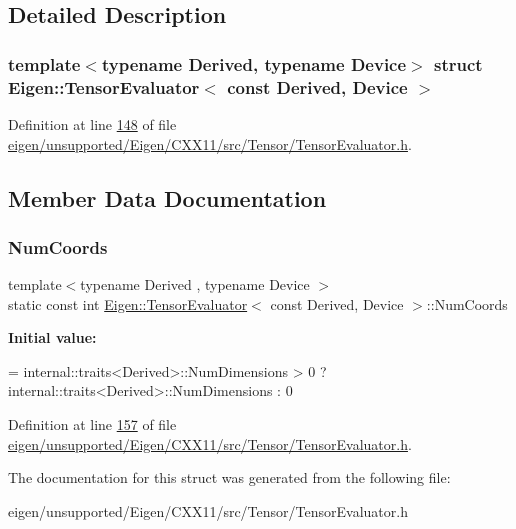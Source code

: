 \subsection{Detailed Description}
\subsubsection*{template$<$typename Derived, typename Device$>$\newline
struct Eigen\+::\+Tensor\+Evaluator$<$ const Derived, Device $>$}



Definition at line \hyperlink{eigen_2unsupported_2_eigen_2_c_x_x11_2src_2_tensor_2_tensor_evaluator_8h_source_l00148}{148} of file \hyperlink{eigen_2unsupported_2_eigen_2_c_x_x11_2src_2_tensor_2_tensor_evaluator_8h_source}{eigen/unsupported/\+Eigen/\+C\+X\+X11/src/\+Tensor/\+Tensor\+Evaluator.\+h}.



\subsection{Member Data Documentation}
\mbox{\label{struct_eigen_1_1_tensor_evaluator_3_01const_01_derived_00_01_device_01_4_a785395ece7a0e0086be23137598ecd24}} 
\subsubsection{\texorpdfstring{Num\+Coords}{NumCoords}}
{\footnotesize\ttfamily template$<$typename Derived , typename Device $>$ \\
static const int \hyperlink{struct_eigen_1_1_tensor_evaluator}{Eigen\+::\+Tensor\+Evaluator}$<$ const Derived, Device $>$\+::Num\+Coords\hspace{0.3cm}{\ttfamily [static]}}

{\bfseries Initial value\+:}
\begin{DoxyCode}
= internal::traits<Derived>::NumDimensions > 0 ?
                               internal::traits<Derived>::NumDimensions : 0
\end{DoxyCode}


Definition at line \hyperlink{eigen_2unsupported_2_eigen_2_c_x_x11_2src_2_tensor_2_tensor_evaluator_8h_source_l00157}{157} of file \hyperlink{eigen_2unsupported_2_eigen_2_c_x_x11_2src_2_tensor_2_tensor_evaluator_8h_source}{eigen/unsupported/\+Eigen/\+C\+X\+X11/src/\+Tensor/\+Tensor\+Evaluator.\+h}.



The documentation for this struct was generated from the following file\+:\begin{DoxyCompactItemize}
\item 
eigen/unsupported/\+Eigen/\+C\+X\+X11/src/\+Tensor/\+Tensor\+Evaluator.\+h\end{DoxyCompactItemize}
